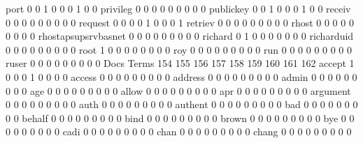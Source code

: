 \documentclass[compress,8pt]{beamer}
\begin{document}
\begin{frame}
\begin{Schunk}
  port                                       0   0   1   0   0   0   1   0   0
  privileg                                   0   0   0   0   0   0   0   0   0
  publickey                                  0   0   1   0   0   0   1   0   0
  receiv                                     0   0   0   0   0   0   0   0   0
  request                                    0   0   0   0   1   0   0   0   1
  retriev                                    0   0   0   0   0   0   0   0   0
  rhost                                      0   0   0   0   0   0   0   0   0
  rhostapsupsrvbasnet                        0   0   0   0   0   0   0   0   0
  richard                                    0   1   0   0   0   0   0   0   0
  richarduid                                 0   0   0   0   0   0   0   0   0
  root                                       1   0   0   0   0   0   0   0   0
  roy                                        0   0   0   0   0   0   0   0   0
  run                                        0   0   0   0   0   0   0   0   0
  ruser                                      0   0   0   0   0   0   0   0   0
                                          Docs
Terms                                      154 155 156 157 158 159 160 161 162
  accept                                     1   0   0   0   1   0   0   0   0
  access                                     0   0   0   0   0   0   0   0   0
  address                                    0   0   0   0   0   0   0   0   0
  admin                                      0   0   0   0   0   0   0   0   0
  age                                        0   0   0   0   0   0   0   0   0
  allow                                      0   0   0   0   0   0   0   0   0
  apr                                        0   0   0   0   0   0   0   0   0
  argument                                   0   0   0   0   0   0   0   0   0
  auth                                       0   0   0   0   0   0   0   0   0
  authent                                    0   0   0   0   0   0   0   0   0
  bad                                        0   0   0   0   0   0   0   0   0
  behalf                                     0   0   0   0   0   0   0   0   0
  bind                                       0   0   0   0   0   0   0   0   0
  brown                                      0   0   0   0   0   0   0   0   0
  bye                                        0   0   0   0   0   0   0   0   0
  cadi                                       0   0   0   0   0   0   0   0   0
  chan                                       0   0   0   0   0   0   0   0   0
  chang                                      0   0   0   0   0   0   0   0   0

\end{Schunk}
\end{frame}
\end{document}
